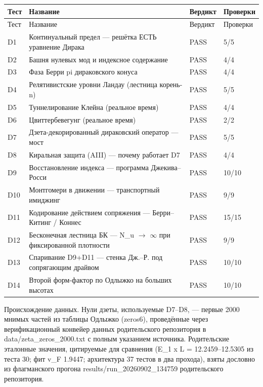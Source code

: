 \documentclass[11pt,a4paper]{article}
\begin{document}
{\small
\begin{longtable}{@{}p{}p{}p{}p{}@{}}
\toprule
Тест & Название & Вердикт & Проверки \\
\midrule
\endfirsthead
\toprule
Тест & Название & Вердикт & Проверки \\
\midrule
\endhead
\bottomrule
\endfoot
D1 & Континуальный предел --- решётка ЕСТЬ уравнение Дирака & PASS & 5/5 \\
D2 & Башня нулевых мод и индексное содержание & PASS & 4/4 \\
D3 & Фаза Берри pi дираковского конуса & PASS & 4/4 \\
D4 & Релятивистские уровни Ландау (лестница корень-n) & PASS & 5/5 \\
D5 & Туннелирование Клейна (реальное время) & PASS & 4/4 \\
D6 & Цвиттербевегунг (реальное время) & PASS & 2/2 \\
D7 & Дзета-декорированный дираковский оператор --- мост & PASS & 5/5 \\
D8 & Киральная защита (AIII) --- почему работает D7 & PASS & 4/4 \\
D9 & Восстановление индекса --- программа Джекива--Росси & PASS & 10/10 \\
D10 & Монтгомери в движении --- транспортный имиджинг & PASS & 9/9 \\
D11 & Кодирование действием сопряжения --- Берри--Китинг / Коннес & PASS & 15/15 \\
D12 & Бесконечная лестница БК --- N\_\allowbreak{}u $\to$ $\infty$ при фиксированной плотности & PASS & 9/9 \\
D13 & Спаривание D9+D11 --- стенка Дж.--Р. под сопрягающим драйвом & PASS & 10/10 \\
D14 & Второй форм-фактор по Одлыжко на больших высотах & PASS & 10/10 \\
\end{longtable}}

Происхождение данных. Нули дзеты, используемые D7--D8, --- первые 2000 мнимых частей из таблицы Одлыжко (zeros6), проведённые через верификационный конвейер данных родительского репозитория в data/zeta\_\allowbreak{}zeros\_\allowbreak{}2000.txt с полным указанием источника. Родительские эталонные значения, цитируемые для сравнения (E\_\allowbreak{}1 x L = 12.2459--12.5305 из теста 30; фит v\_\allowbreak{}F 1.9447; архитектура 37 тестов в два прохода), взяты дословно из флагманского прогона results/run\_\allowbreak{}20260902\_\allowbreak{}134759 родительского репозитория.
\end{document}
